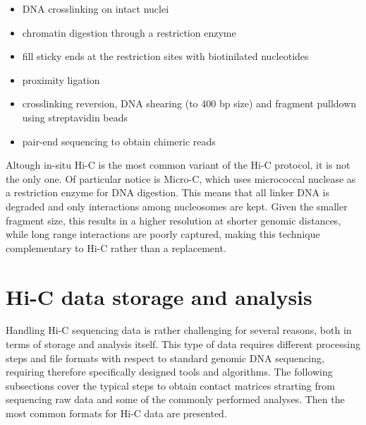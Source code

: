 \begin{itemize}\tightlist
  \item DNA crosslinking on intact nuclei
  \item chromatin digestion through a restriction enzyme
  \item fill sticky ends at the restriction sites with biotinilated nucleotides
  \item proximity ligation
  \item crosslinking reversion, DNA shearing (to 400 bp size) and fragment pulldown using streptavidin beads
  \item pair-end sequencing to obtain chimeric reads
\end{itemize}
 
Altough in-situ Hi-C is the most common variant of the Hi-C protocol, it is not the only one. Of particular notice is Micro-C\cite{microc2015}, which uses micrococcal nuclease as a restriction enzyme for DNA digestion. This means that all linker DNA is degraded and only interactions among nucleosomes are kept. Given the smaller fragment size, this results in a higher resolution at shorter genomic distances, while long range interactions are poorly captured, making this technique complementary to Hi-C rather than a replacement.


\section{Hi-C data storage and analysis}

Handling Hi-C sequencing data is rather challenging for several reasons, both in terms of storage and analysis itself. This type of data requires different processing steps and file formats with respect to standard genomic DNA sequencing, requiring therefore specifically designed tools and algorithms. The following subsections cover the typical steps to obtain contact matrices strarting from sequencing raw data and some of the commonly performed analyses\cite{hicprocessing2018}. Then the most common formats for Hi-C data are presented.

